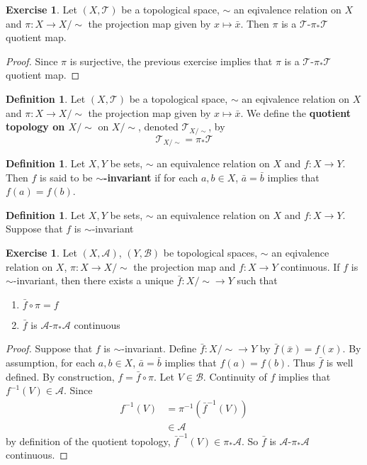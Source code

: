 \documentclass[12pt]{amsart}
\theoremstyle{definition}
\newtheorem{defn}[definition]{Definition}
\newtheorem{ex}[definition]{Exercise}
\newcommand{\MA}{\mathcal{A}}
\newcommand{\MB}{\mathcal{B}}
\newcommand{\MT}{\mathcal{T}}
\newcommand{\lex}[1]{\label{ex:#1}}
\begin{document}
	
	\begin{ex} \lex{34008}
	Let $(X, \MT)$ be a topological space, $\sim$ an eqivalence relation on $X$ and $\pi:X \rightarrow X/\sim$ the projection map given by $x \mapsto \bar{x}$. Then $\pi$ is a $\MT$-$\pi_*\MT$ quotient map. 
	\end{ex}
	
	\begin{proof}
	Since $\pi$ is surjective, the previous exercise implies that $\pi$ is a $\MT$-$\pi_*\MT$ quotient map. 
	\end{proof}

	\begin{defn}
		Let $(X, \MT)$ be a topological space, $\sim$ an eqivalence relation on $X$ and $\pi:X \rightarrow X/\sim$ the projection map given by $x \mapsto \bar{x}$. We define the \textbf{quotient topology on $X / \sim$} on $X/ \sim$, denoted $\MT_{X/ \sim}$, by $$\MT_{X/ \sim} = \pi_{*}\MT$$
	\end{defn}
	
	\begin{defn}
	Let $X,Y$ be sets, $\sim$ an equivalence relation on $X$ and $f: X \rightarrow Y$. Then $f$ is said to be \textbf{$\sim$-invariant} if for each $a,b \in X$, $\bar{a} = \bar{b}$ implies that $f(a) = f(b)$. 
	\end{defn}
	
	\begin{defn}
	Let $X,Y$ be sets, $\sim$ an equivalence relation on $X$ and $f: X \rightarrow Y$. Suppose that $f$ is $\sim$-invariant
	\end{defn}
	
	\begin{ex} \lex{34008}
	Let $(X, \MA)$, $(Y, \MB)$ be topological spaces, $\sim$ an eqivalence relation on $X$, $\pi:X \rightarrow X/\sim$ the projection map and $f:X \rightarrow Y$ continuous. If $f$ is $\sim$-invariant, then there exists a unique $\bar{f}:X / {\sim} \rightarrow Y$ such that 
	\begin{enumerate}
	\item $\bar{f} \circ \pi = f$
	\item $\bar{f}$ is $\MA$-$\pi_*\MA$ continuous 
	\end{enumerate}
	\end{ex}
	
	\begin{proof}
	Suppose that $f$ is $\sim$-invariant. Define $\bar{f}: X / {\sim} \rightarrow Y$ by $\bar{f}(\bar{x}) = f(x)$. By assumption, for each $a, b \in X$, $\bar{a} = \bar{b}$ implies that $f(a) = f(b)$. Thus $\bar{f}$ is well defined. By construction, $f = \bar{f} \circ \pi$. Let $V \in \MB$. Continuity of $f$ implies that $f^{-1}(V) \in \MA$. Since 
	\begin{align*}
	f^{-1}(V)
	&= \pi^{-1}(\bar{f}^{-1}(V)) \\
	& \in \MA
\end{align*}
by definition of the quotient topology, $\bar{f}^{-1}(V) \in \pi_*\MA$. So $\bar{f}$ is $\MA$-$\pi_*\MA$ continuous.
	
	\end{proof}
	
\end{document}
